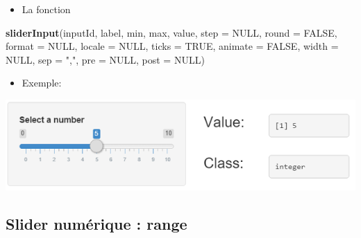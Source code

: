 \documentclass[]{article}
\newenvironment{Shaded}{\begin{snugshade}}{\end{snugshade}}
\newcommand{\KeywordTok}[1]{\textcolor[rgb]{0.13,0.29,0.53}{\textbf{#1}}}
\newcommand{\DataTypeTok}[1]{\textcolor[rgb]{0.13,0.29,0.53}{#1}}
\newcommand{\DecValTok}[1]{\textcolor[rgb]{0.00,0.00,0.81}{#1}}
\newcommand{\StringTok}[1]{\textcolor[rgb]{0.31,0.60,0.02}{#1}}
\newcommand{\CommentTok}[1]{\textcolor[rgb]{0.56,0.35,0.01}{\textit{#1}}}
\newcommand{\OtherTok}[1]{\textcolor[rgb]{0.56,0.35,0.01}{#1}}
\newcommand{\NormalTok}[1]{#1}
\providecommand{\tightlist}{%
  \setlength{\itemsep}{0pt}\setlength{\parskip}{0pt}}
\begin{document}
\begin{itemize}
\tightlist
\item
  La fonction
\end{itemize}

\begin{Shaded}
\begin{Highlighting}[]
\KeywordTok{sliderInput}\NormalTok{(inputId, label, min, max, value, }\DataTypeTok{step =} \OtherTok{NULL}\NormalTok{, }\DataTypeTok{round =} \OtherTok{FALSE}\NormalTok{,}
            \DataTypeTok{format =} \OtherTok{NULL}\NormalTok{, }\DataTypeTok{locale =} \OtherTok{NULL}\NormalTok{, }\DataTypeTok{ticks =} \OtherTok{TRUE}\NormalTok{, }\DataTypeTok{animate =} \OtherTok{FALSE}\NormalTok{,}
            \DataTypeTok{width =} \OtherTok{NULL}\NormalTok{, }\DataTypeTok{sep =} \StringTok{","}\NormalTok{, }\DataTypeTok{pre =} \OtherTok{NULL}\NormalTok{, }\DataTypeTok{post =} \OtherTok{NULL}\NormalTok{)}
\end{Highlighting}
\end{Shaded}

\begin{itemize}
\tightlist
\item
  Exemple:
\end{itemize}

\begin{Shaded}
\end{Shaded}

\includegraphics{img/slider.png}

\subsection{Slider numérique : range}\label{slider-numerique-range}
\end{document}
